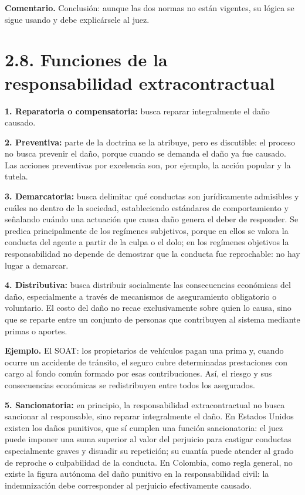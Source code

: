 \begin{comentario}
\textcolor[HTML]{8A6D3B}{\textbf{Comentario. }}Conclusión: aunque las dos normas no están vigentes, su lógica se sigue usando y debe explicársele al juez.
\end{comentario}
\section{2.8. Funciones de la responsabilidad extracontractual}
\textbf{1. Reparatoria o compensatoria:} busca reparar integralmente el daño causado.

\textbf{2. Preventiva:} parte de la doctrina se la atribuye, pero es discutible: el proceso no busca prevenir el daño, porque cuando se demanda el daño ya fue causado. Las acciones preventivas por excelencia son, por ejemplo, la acción popular y la tutela.

\textbf{3. Demarcatoria:} busca delimitar qué conductas son jurídicamente admisibles y cuáles no dentro de la sociedad, estableciendo estándares de comportamiento y señalando cuándo una actuación que causa daño genera el deber de responder. Se predica principalmente de los regímenes subjetivos, porque en ellos se valora la conducta del agente a partir de la culpa o el dolo; en los regímenes objetivos la responsabilidad no depende de demostrar que la conducta fue reprochable: no hay lugar a demarcar.

\textbf{4. Distributiva:} busca distribuir socialmente las consecuencias económicas del daño, especialmente a través de mecanismos de aseguramiento obligatorio o voluntario. El costo del daño no recae exclusivamente sobre quien lo causa, sino que se reparte entre un conjunto de personas que contribuyen al sistema mediante primas o aportes.

\begin{ejemplo}
\textcolor[HTML]{4F6228}{\textbf{Ejemplo. }}El SOAT: los propietarios de vehículos pagan una prima y, cuando ocurre un accidente de tránsito, el seguro cubre determinadas prestaciones con cargo al fondo común formado por esas contribuciones. Así, el riesgo y sus consecuencias económicas se redistribuyen entre todos los asegurados.
\end{ejemplo}
\textbf{5. Sancionatoria:} en principio, la responsabilidad extracontractual no busca sancionar al responsable, sino reparar integralmente el daño. En Estados Unidos existen los daños punitivos, que sí cumplen una función sancionatoria: el juez puede imponer una suma superior al valor del perjuicio para castigar conductas especialmente graves y disuadir su repetición; su cuantía puede atender al grado de reproche o culpabilidad de la conducta. En Colombia, como regla general, no existe la figura autónoma del daño punitivo en la responsabilidad civil: la indemnización debe corresponder al perjuicio efectivamente causado.


